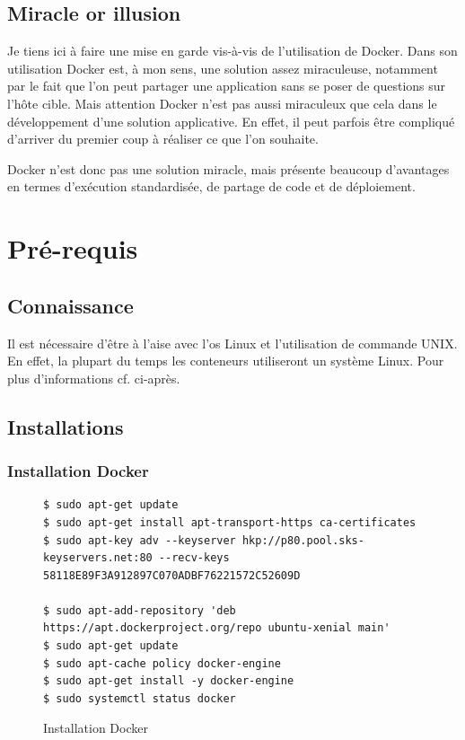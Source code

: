 \subsection{Miracle or illusion}
Je tiens ici à faire une mise en garde vis-à-vis de l'utilisation de Docker. Dans son utilisation Docker est, à mon sens, une solution assez miraculeuse, notamment par le fait que l'on peut partager une application sans se poser de questions sur l'hôte cible. Mais attention Docker n'est pas aussi miraculeux que cela dans le développement d'une solution applicative. En effet, il peut parfois être compliqué d'arriver du premier coup à réaliser ce que l'on souhaite.

Docker n'est donc pas une solution miracle, mais présente beaucoup d'avantages en termes d'exécution standardisée, de partage de code et de déploiement.

\newpage
\section{Pré-requis}
\subsection{Connaissance}
Il est nécessaire d'être à l’aise avec l'\gls{os} Linux et l'utilisation de commande UNIX. En effet, la plupart du temps les conteneurs utiliseront un système Linux. Pour plus d'informations cf. ci-après.


\subsection{Installations}
\lstset{language=bash}

\subsubsection{Installation Docker}
\begin{figure}[H] 
\centering 
\begin{lstlisting}[frame=single]
$ sudo apt-get update
$ sudo apt-get install apt-transport-https ca-certificates
$ sudo apt-key adv --keyserver hkp://p80.pool.sks-keyservers.net:80 --recv-keys 58118E89F3A912897C070ADBF76221572C52609D

$ sudo apt-add-repository 'deb https://apt.dockerproject.org/repo ubuntu-xenial main'
$ sudo apt-get update
$ sudo apt-cache policy docker-engine
$ sudo apt-get install -y docker-engine
$ sudo systemctl status docker
\end{lstlisting}
\caption[Code - Installation Docker]{Installation Docker}
\label{fig:installDocker} 
\end{figure}


